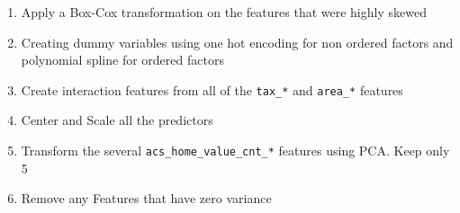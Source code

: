 \documentclass[]{book}
\providecommand{\tightlist}{%
  \setlength{\itemsep}{0pt}\setlength{\parskip}{0pt}}
\theoremstyle{definition}
\theoremstyle{definition}
\theoremstyle{definition}
\theoremstyle{remark}
\begin{document}
\begin{enumerate}
\def\labelenumi{\arabic{enumi}.}
\tightlist
\item
  Apply a Box-Cox transformation on the features that were highly skewed
\item
  Creating dummy variables using one hot encoding for non ordered
  factors and polynomial spline for ordered factors
\item
  Create interaction features from all of the \texttt{tax\_*} and
  \texttt{area\_*} features
\item
  Center and Scale all the predictors
\item
  Transform the several \texttt{acs\_home\_value\_cnt\_*} features using
  PCA. Keep only 5
\item
  Remove any Features that have zero variance
\end{enumerate}
\end{document}
